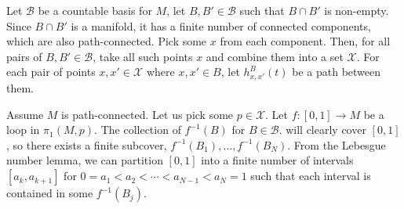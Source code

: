 \documentclass[aps,pra,showpacs,notitlepage,onecolumn,superscriptaddress,nofootinbib]{revtex4-1}
\theoremstyle{definition}
\begin{document}
\noindent
Let $\mathcal{B}$ be a countable basis for $M$, let $B, B' \in \mathcal{B}$ such that $B \cap B'$ is non-empty. Since $B \cap B'$ is a manifold, it has a finite number of connected components, which
are also path-connected. Pick some $x$ from each component. Then, for all pairs of $B, B' \in \mathcal{B}$, take all such points $x$ and combine them into a set $\mathcal{X}$. For each pair of points $x, x' \in \mathcal{X}$ where $x, x' \in B$,
let $h_{x, x'}^{B}(t)$ be a path between them.

Assume $M$ is path-connected. Let us pick some $p \in \mathcal{X}$. Let $f : [0, 1] \rightarrow M$ be a loop in $\pi_1(M, p)$. The collection of $f^{-1}(B)$ for $B \in \mathcal{B}$. will clearly cover $[0, 1]$,
so there exists a finite subcover, $f^{-1}(B_1), \dots, f^{-1}(B_N)$. From the Lebesgue number lemma, we can partition $[0, 1]$ into a finite number of intervals $[a_k, a_{k + 1}]$ for $0 = a_1 < a_2 < \cdots < a_{N - 1} < a_N = 1$ such
that each interval is contained in some $f^{-1}(B_j)$.


\hrulefill

\end{document}
